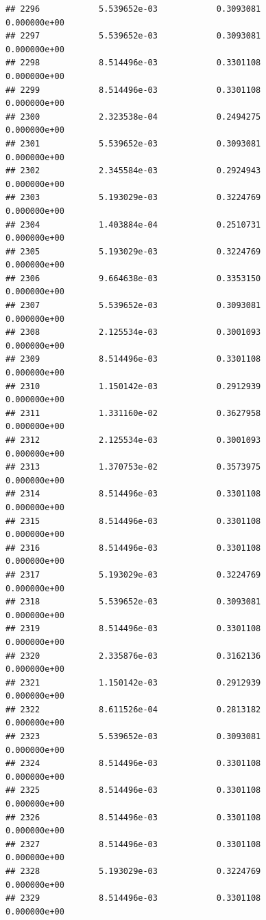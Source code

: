 \documentclass[
]{article}
\begin{document}
\begin{verbatim}
## 2296            5.539652e-03            0.3093081            0.000000e+00
## 2297            5.539652e-03            0.3093081            0.000000e+00
## 2298            8.514496e-03            0.3301108            0.000000e+00
## 2299            8.514496e-03            0.3301108            0.000000e+00
## 2300            2.323538e-04            0.2494275            0.000000e+00
## 2301            5.539652e-03            0.3093081            0.000000e+00
## 2302            2.345584e-03            0.2924943            0.000000e+00
## 2303            5.193029e-03            0.3224769            0.000000e+00
## 2304            1.403884e-04            0.2510731            0.000000e+00
## 2305            5.193029e-03            0.3224769            0.000000e+00
## 2306            9.664638e-03            0.3353150            0.000000e+00
## 2307            5.539652e-03            0.3093081            0.000000e+00
## 2308            2.125534e-03            0.3001093            0.000000e+00
## 2309            8.514496e-03            0.3301108            0.000000e+00
## 2310            1.150142e-03            0.2912939            0.000000e+00
## 2311            1.331160e-02            0.3627958            0.000000e+00
## 2312            2.125534e-03            0.3001093            0.000000e+00
## 2313            1.370753e-02            0.3573975            0.000000e+00
## 2314            8.514496e-03            0.3301108            0.000000e+00
## 2315            8.514496e-03            0.3301108            0.000000e+00
## 2316            8.514496e-03            0.3301108            0.000000e+00
## 2317            5.193029e-03            0.3224769            0.000000e+00
## 2318            5.539652e-03            0.3093081            0.000000e+00
## 2319            8.514496e-03            0.3301108            0.000000e+00
## 2320            2.335876e-03            0.3162136            0.000000e+00
## 2321            1.150142e-03            0.2912939            0.000000e+00
## 2322            8.611526e-04            0.2813182            0.000000e+00
## 2323            5.539652e-03            0.3093081            0.000000e+00
## 2324            8.514496e-03            0.3301108            0.000000e+00
## 2325            8.514496e-03            0.3301108            0.000000e+00
## 2326            8.514496e-03            0.3301108            0.000000e+00
## 2327            8.514496e-03            0.3301108            0.000000e+00
## 2328            5.193029e-03            0.3224769            0.000000e+00
## 2329            8.514496e-03            0.3301108            0.000000e+00

\end{verbatim}
\end{document}
